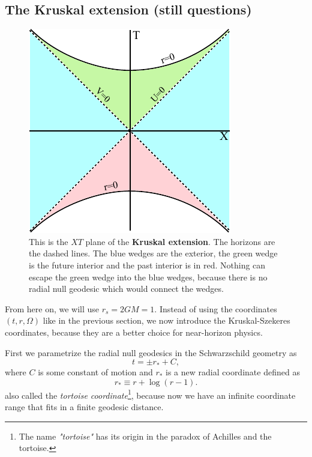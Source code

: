 \subsection{The Kruskal extension \checkmark (still questions)}
		\begin{figure}[htbp]
			\begin{center}
				\includegraphics[scale=1]{kruskal}
			\end{center}
			\caption{This is the $XT$ plane of the \textbf{Kruskal extension}. The horizons are the dashed lines. The {\color{blue} blue} wedges are the exterior, the {\color{forestgreen} green} wedge is the future interior and the past interior is in {\color{red} red}. Nothing can escape the {\color{forestgreen} green} wedge into the {\color{blue} blue} wedges, because there is no radial null geodesic which would connect the wedges.}\label{kruskal}	
		\end{figure}
	From here on, we will use $r_{s}=2GM=1$.
	Instead of using the coordinates $(t,r,\Omega)$ like in the previous section, we now introduce the Kruskal-Szekeres coordinates, because they are a better choice for near-horizon physics.
	
	First we parametrize the radial null geodesics in the Schwarzschild geometry as
		\begin{equation}
			t=\pm r_{*} + C,
		\end{equation}
	where $C$ is some constant of motion and $r_{*}$ is a new radial coordinate defined as
		\begin{equation} \label{r_*tortoise}
			r_{*}\equiv r+\log (r-1).
		\end{equation}
	also called the \textit{tortoise coordinate}\footnote{The name \textit{"tortoise"} has its origin in the paradox of Achilles and the tortoise.}, because now we have an infinite coordinate range that fits in a finite geodesic distance. 
		
